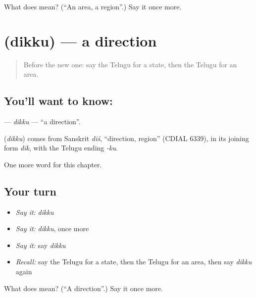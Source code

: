 \begin{tcolorbox}[breakable,colback=teal!4,colframe=teal!35!black,title={Before you move on}]
What does  mean? (\textquotedblleft{}An area, a region\textquotedblright{}.) Say it once more.
\end{tcolorbox}
\section[\texorpdfstring{\te{దిక్కు} (dikku)}{దిక్కు (dikku)}]{ (dikku) — a direction}

\label{lesson:TE-C254-dikku}



\begin{quote}
Before the new one: say the Telugu for a state, then the Telugu for an area.
\end{quote}

\subsection*{You'll want to know: }
\textbf{} — \emph{dikku} — \textquotedblleft{}a direction\textquotedblright{}.

\begin{cousinweb}
\textbf{} (\emph{dikku}) comes from Sanskrit \emph{diś}, \textquotedblleft{}direction, region\textquotedblright{} (CDIAL 6339), in its joining form \emph{dik}, with the Telugu ending \emph{-ku}.
\end{cousinweb}

\begin{grammarlens}[title={What you've built}]
One more word for this chapter.
\end{grammarlens}

\subsection*{Your turn}
\begin{itemize}
\raggedright
  \item \emph{Say it:} \emph{dikku}
  \item \emph{Say it:} \emph{dikku}, once more
  \item \emph{Say it:} say \emph{dikku}
  \item \emph{Recall:} say the Telugu for a state, then the Telugu for an area, then say \emph{dikku} again
\end{itemize}

\begin{tcolorbox}[breakable,colback=teal!4,colframe=teal!35!black,title={Before you move on}]
What does  mean? (\textquotedblleft{}A direction\textquotedblright{}.) Say it once more.
\end{tcolorbox}
